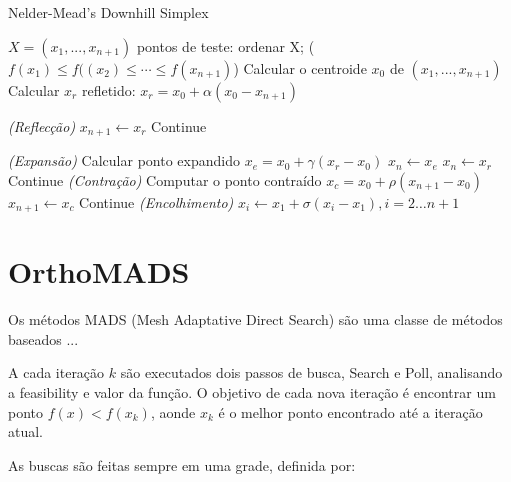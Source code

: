 \begin{algorithm}
    \caption{Nelder-Mead's Downhill Simplex}
    \label{alg:int_point_ocp}
    \begin{algorithmic}[1] %
        \Require $X = (x_1, ... , x_{n+1})$ pontos de teste:
                \State ordenar X; ($f(x _1) \leq f(({x} _2) \leq \cdots \leq f(x_{n+1})$) 
                \State Calcular o centroide $x_0$ de $(x_{1}, ... , x_{n+1})$
                \State Calcular $x_r$ refletido: $x_r = x_0 + \alpha(x_0 - x_{n+1})$ 
                
\BState \emph{(Reflecção)}                
                    \State $x_{n+1} \gets x_r$
                    \State Continue
                \EndIf

\BState \emph{(Expansão)}
                    \State Calcular ponto expandido $x_e = x_0 + \gamma(x_r - x_0) $
                        \State $x_n \gets x_e$
                    \Else
                        \State $x_n \gets x_r$                  
                    \EndIf
                    \State Continue
                \EndIf
\BState \emph{(Contração)}
                \State Computar o ponto contraído $x_c = x_0 + \rho(x_{n+1} - x_0)$
                    \State $x_{n+1} \gets x_c$
                    \State Continue             
                \EndIf
\BState \emph{(Encolhimento)}
                \State $x_i \gets x_1 + \sigma(x_i - x_1), i=2 \dots n+1$
            \EndWhile
    \end{algorithmic}
\end{algorithm}



\section{OrthoMADS}

Os métodos MADS (Mesh Adaptative Direct Search) são uma classe de métodos baseados ...


A cada iteração $ k $ são executados dois passos de busca, Search e Poll, analisando a feasibility e valor da função. O objetivo de cada nova iteração é encontrar um ponto $f(x) < f(x_k)$, aonde $x_k$ é o melhor ponto encontrado até a iteração atual. 

As buscas são feitas sempre em uma grade, definida por:

